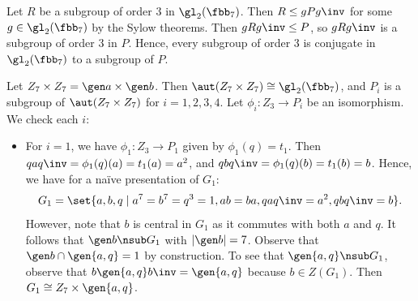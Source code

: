 \begin{solenum}[spsol]
    Let $R$ be a subgroup of order 3 in $\gl_2(\fbb_7)$.
	Then $R \leq gPg\inv$ for some $g \in \gl_2(\fbb_7)$ by the Sylow theorems.
	Then $gRg\inv \leq P$, so $gRg\inv$ is a subgroup of order 3 in $P$.
	Hence, every subgroup of order 3 is conjugate in $\gl_2(\fbb_7)$ to a subgroup of $P$.
    \item Let $Z_7 \times Z_7 = \gen a \times \gen b$.
	Then $\aut(Z_7 \times Z_7) \cong \gl_2(\fbb_7)$, and $P_i$ is a subgroup of $\aut(Z_7 \times Z_7)$ for $i = 1, 2, 3, 4$.
	Let $\phi_i : Z_3 \to P_i$ be an isomorphism.
	We check each $i$:
    \begin{itemize}
        \item For $i = 1$, we have $\phi_1 : Z_3 \to P_1$ given by $\phi_1(q) = t_1$.
	    Then $qaq\inv = \phi_1(q)(a) = t_1(a) = a^2$, and $qbq\inv = \phi_1(q)(b) = t_1(b) = b$.
	    Hence, we have for a na\"ive presentation of $G_1$:
        \[
        	G_1 = \set{a, b, q \mid a^7 = b^7 = q^3 = 1, ab = ba, qaq\inv = a^2, qbq\inv = b}.
        \]
        However, note that $b$ is central in $G_1$ as it commutes with both $a$ and $q$.
        It follows that $\gen b \nsub G_1$ with $|\gen b| = 7$.
        Observe that $\gen b \cap \gen{a, q} = 1$ by construction.
        To see that $\gen{a, q} \nsub G_1$, observe that $b\gen{a, q}b\inv = \gen{a, q}$ because $b \in Z(G_1)$.
        Then $G_1 \cong Z_7 \times \gen{a, q}$.


\end{itemize}
\end{solenum}
